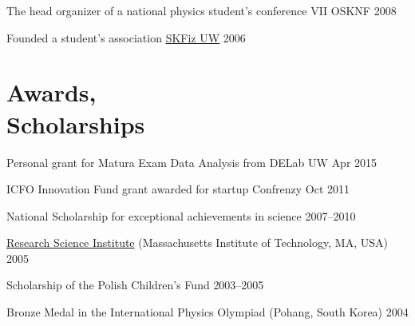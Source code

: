 \documentclass[margin,line]{resume}
\begin{document}
\begin{resume}
\begin{list2}
        \item The head organizer of a national physics student's conference VII OSKNF \hfill { 2008}
        \item Founded a student's association \href{http://skfiz.fuw.edu.pl/en}{SKFiz UW} \hfill { 2006}
    \end{list2}


    \section{\mysidestyle Awards,\\Scholarships}
    \begin{list2}
        \item Personal grant for Matura Exam Data Analysis from DELab UW \hfill {Apr 2015}
    	\item ICFO Innovation Fund grant awarded for startup Confrenzy \hfill { Oct 2011}
        \item National Scholarship for exceptional achievements in science \hfill { 2007--2010}
        \item \href{http://www.cee.org/research-science-institute}{Research Science Institute} (Massachusetts Institute of Technology, MA, USA) \hfill { 2005}
        \item Scholarship of the Polish Children's Fund \hfill { 2003--2005}
        \item Bronze Medal in the International Physics Olympiad (Pohang, South Korea) \hfill { 2004}
    \end{list2}


\end{resume}
\end{document}

